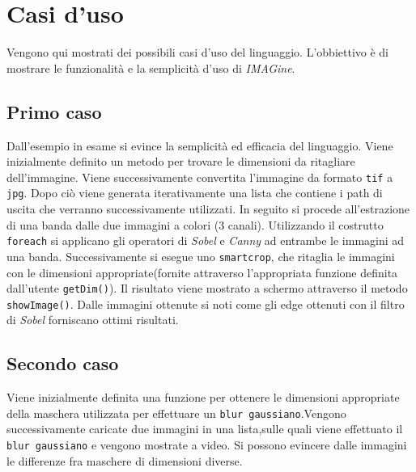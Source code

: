 \documentclass[10pt]{article}
\begin{document}
\section{Casi d'uso}
Vengono qui mostrati dei possibili casi d'uso del linguaggio. L'obbiettivo è di mostrare le funzionalità e la semplicità d'uso di \textit{IMAGine}.



\subsection{Primo caso}
Dall'esempio in esame si evince la semplicità ed efficacia del linguaggio.
Viene inizialmente definito un metodo per trovare le dimensioni da ritagliare dell'immagine. Viene successivamente convertita l'immagine da formato \texttt{tif} a \texttt{jpg}. Dopo ciò viene generata iterativamente una lista che contiene i path di uscita che verranno successivamente utilizzati. In seguito si procede all'estrazione di una banda dalle due immagini a colori (3 canali). Utilizzando il costrutto \texttt{foreach} si applicano gli operatori di \textit{Sobel} e \textit{Canny} ad entrambe le immagini ad una banda. Successivamente si esegue uno \texttt{smartcrop}, che ritaglia le immagini con le dimensioni appropriate(fornite attraverso l'appropriata funzione definita dall'utente \texttt{getDim()}). Il risultato viene mostrato a schermo attraverso il metodo \texttt{showImage()}. Dalle immagini ottenute si noti come gli edge ottenuti con il filtro di \textit{Sobel} forniscano ottimi risultati.

\clearpage


\subsection{Secondo caso}
Viene inizialmente definita una funzione per ottenere le dimensioni appropriate della maschera utilizzata per effettuare un \texttt{blur gaussiano}.Vengono successivamente caricate due immagini in una lista,sulle quali viene effettuato il \texttt{blur gaussiano} e vengono mostrate a video. Si possono evincere dalle immagini le differenze fra maschere di dimensioni diverse.


\clearpage
\end{document}
